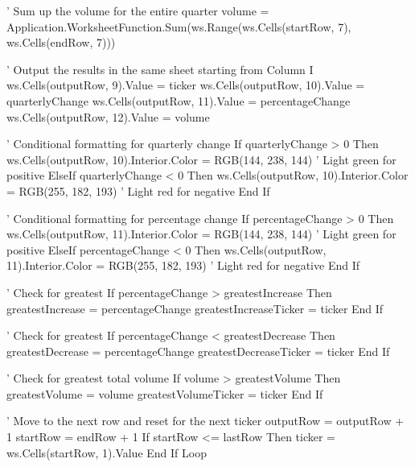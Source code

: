                 ' Sum up the volume for the entire quarter
                volume = Application.WorksheetFunction.Sum(ws.Range(ws.Cells(startRow, 7), ws.Cells(endRow, 7)))
                
                ' Output the results in the same sheet starting from Column I
                ws.Cells(outputRow, 9).Value = ticker
                ws.Cells(outputRow, 10).Value = quarterlyChange
                ws.Cells(outputRow, 11).Value = percentageChange
                ws.Cells(outputRow, 12).Value = volume
                
                ' Conditional formatting for quarterly change
                If quarterlyChange > 0 Then
                    ws.Cells(outputRow, 10).Interior.Color = RGB(144, 238, 144) ' Light green for positive
                ElseIf quarterlyChange < 0 Then
                    ws.Cells(outputRow, 10).Interior.Color = RGB(255, 182, 193) ' Light red for negative
                End If
                
                ' Conditional formatting for percentage change
                If percentageChange > 0 Then
                    ws.Cells(outputRow, 11).Interior.Color = RGB(144, 238, 144) ' Light green for positive
                ElseIf percentageChange < 0 Then
                    ws.Cells(outputRow, 11).Interior.Color = RGB(255, 182, 193) ' Light red for negative
                End If
                
                ' Check for greatest %
                If percentageChange > greatestIncrease Then
                    greatestIncrease = percentageChange
                    greatestIncreaseTicker = ticker
                End If
                
                ' Check for greatest %
                If percentageChange < greatestDecrease Then
                    greatestDecrease = percentageChange
                    greatestDecreaseTicker = ticker
                End If
                
                ' Check for greatest total volume
                If volume > greatestVolume Then
                    greatestVolume = volume
                    greatestVolumeTicker = ticker
                End If
                
                ' Move to the next row and reset for the next ticker
                outputRow = outputRow + 1
                startRow = endRow + 1
                If startRow <= lastRow Then
                    ticker = ws.Cells(startRow, 1).Value
                End If
            Loop
            
